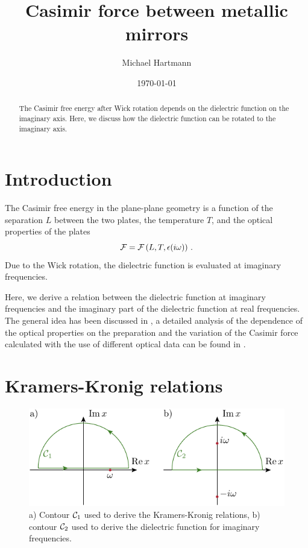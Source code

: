 \documentclass[twocolumn,superscriptaddress,pre]{revtex4-1}
\begin{document}
\title{Casimir force between metallic mirrors}

\author{Michael Hartmann}

\date{\today}

\begin{abstract}
The Casimir free energy after Wick rotation depends on the dielectric function
on the imaginary axis. Here, we discuss how the dielectric function can be
rotated to the imaginary axis.
\end{abstract}

\maketitle

\section{Introduction}

The Casimir free energy in the plane-plane geometry is a function of the
separation $L$ between the two plates, the temperature $T$, and the optical
properties of the plates
\begin{equation}
{\cal F} = {\cal F}\left(L,T,\epsilon(i\omega)\right) \,.
\end{equation}
Due to the Wick rotation, the dielectric function is evaluated at imaginary
frequencies.

Here, we derive a relation between the dielectric function at imaginary
frequencies and the imaginary part of the dielectric function at real
frequencies.  The general idea has been discussed in \cite{Lambrecht2000}, a
detailed analysis of the dependence of the optical properties on the
preparation and the variation of the Casimir force calculated with the use of
different optical data can be found in \cite{Pirozhenko2006}.

\section{Kramers-Kronig relations}

\begin{figure}
\includegraphics[width=0.9\columnwidth]{img/contour.pdf}
\caption{a) Contour ${\cal C}_1$ used to derive the Kramers-Kronig relations, b)
contour ${\cal C}_2$ used to derive the dielectric function for imaginary
frequencies.}
\label{fig:contour}
\end{figure}
\end{document}
